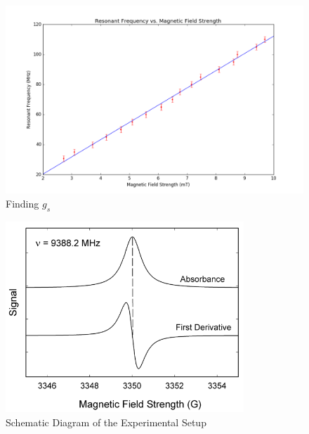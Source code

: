\documentclass{amsart}
\begin{document}
\begin{figure}
    \centering
    \includegraphics[width=\textwidth]{fitted.png}
    \caption{Finding $g_s$}
\end{figure}

\begin{figure}
    \centering
    \includegraphics[width=0.8\textwidth]{lines.png}
    \caption{Schematic Diagram of the Experimental Setup}
\end{figure}
\end{document}
